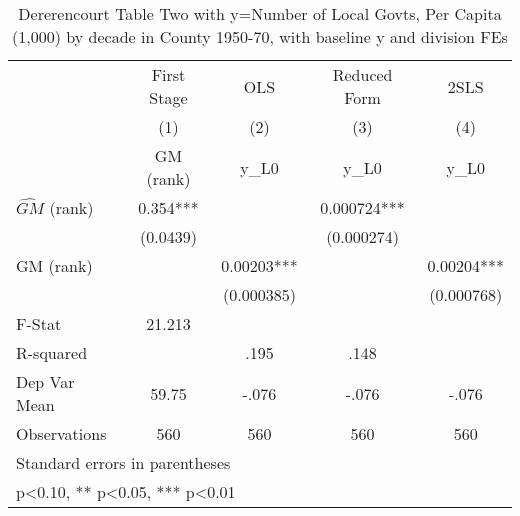 \begin{table}[htbp]\centering
\def\sym#1{\ifmmode^{#1}\else\(^{#1}\)\fi}
\caption{Dererencourt Table Two with y=Number of Local Govts, Per Capita (1,000) by decade in County 1950-70, with baseline y and division FEs}
\begin{tabular}{l*{4}{c}}
\toprule
                    & First Stage   &         OLS   &Reduced Form   &        2SLS   \\
                    &\multicolumn{1}{c}{(1)}&\multicolumn{1}{c}{(2)}&\multicolumn{1}{c}{(3)}&\multicolumn{1}{c}{(4)}\\
                    &\multicolumn{1}{c}{GM  (rank)}&\multicolumn{1}{c}{y\_L0}&\multicolumn{1}{c}{y\_L0}&\multicolumn{1}{c}{y\_L0}\\
\midrule
$\hat{GM}$ (rank)   &       0.354***&               &    0.000724***&               \\
                    &    (0.0439)   &               &  (0.000274)   &               \\
\addlinespace
GM  (rank)          &               &     0.00203***&               &     0.00204***\\
                    &               &  (0.000385)   &               &  (0.000768)   \\
\midrule
F-Stat              &      21.213   &               &               &               \\
R-squared           &               &        .195   &        .148   &               \\
Dep Var Mean        &       59.75   &       -.076   &       -.076   &       -.076   \\
Observations        &         560   &         560   &         560   &         560   \\
\bottomrule
\multicolumn{5}{l}{\footnotesize Standard errors in parentheses}\\
\multicolumn{5}{l}{\footnotesize * p<0.10, ** p<0.05, *** p<0.01}\\
\end{tabular}
\end{table}
